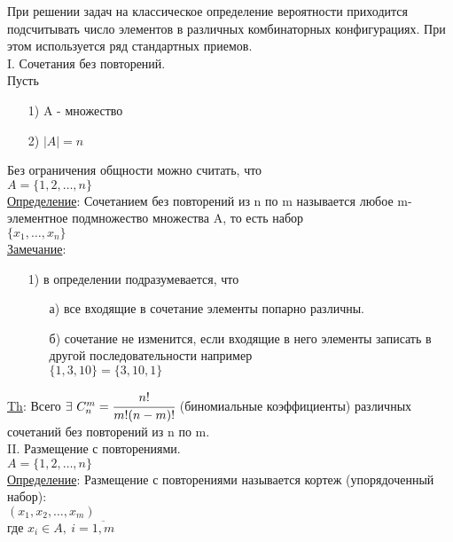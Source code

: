 
При решении задач на классическое определение вероятности приходится подсчитывать число элементов в различных комбинаторных конфигурациях. При этом используется ряд стандартных приемов. \\

I. Сочетания без повторений. \\
Пусть \\
\begin{enumerate}
\item[1)] A - множество \\

\item[2)] $|A| = n$ \\
\end{enumerate}
Без ограничения общности можно считать, что \\
$A = \{1,2, \ldots, n\}$ \\

\underline{Определение}: Сочетанием без повторений из n по m называется любое m-элементное подмножество множества A, то есть набор \\
$\{x_1, \ldots, x_n\}$ \\


\underline{Замечание}:
\begin{enumerate}
\item[1)] в определении подразумевается, что
	\begin{enumerate}
	\item[а)] все входящие в сочетание элементы попарно различны.
	
	\item[б)] сочетание не изменится, если входящие в него элементы записать в другой последовательности например \\
	$\{1,3,10\} = \{3,10,1\}$ \\
	\end{enumerate}
\end{enumerate}


\underline{Th}: Всего $\exists \ C^m_n = \cfrac{n!}{m! (n-m)!}$  (биномиальные коэффициенты) различных сочетаний без повторений из n по m. \\


II. Размещение с повторениями. \\
$A = \{1,2, \ldots, n\}$ \\
\underline{Определение}: Размещение с повторениями называется кортеж (упорядоченный набор): \\
$(x_1, x_2, \ldots, x_m)$ \\
где $x_i \in A, \ i = \overline{1,m}$ \\


